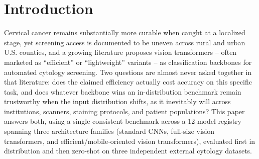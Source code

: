 \documentclass[runningheads]{llncs}
\begin{document}
\begin{abstract}
transformer-family models cluster at 0.293--0.523 (with one transformer
landing 0.003 above the lowest CNN -- a real, reported exception, not a
clean partition); on APCEM this apparent CNN-vs-transformer split
collapses entirely, since the CNN family alone spans both the best
(MobileNetV2) and one of the worst (ResNet-50) models in the registry.
One model (MobileViT-S) collapses to a Mendeley LBC AUROC of 0.215 --
actively anti-correlated with ground truth, not merely uninformative --
while its own architectural successor (MobileViTv2) shows no such failure
and is in fact the strongest model on that milder shift condition. No
single static property we measured -- parameter count, FLOPs,
in-distribution accuracy, or architecture family/lineage -- reliably
predicts which model fails safely under domain shift, and which model
fails safely is itself not stable across which external dataset is used
to test it.

\end{abstract}

\section{Introduction}

Cervical cancer remains substantially more curable when caught at a
localized stage, yet screening access is documented to be uneven across
rural and urban U.S. counties, and a growing literature proposes vision
transformers -- often marketed as ``efficient'' or ``lightweight''
variants -- as classification backbones for automated cytology screening.
Two questions are almost never asked together in that literature: does
the claimed efficiency actually cost accuracy on this specific task, and
does whatever backbone wins an in-distribution benchmark remain
trustworthy when the input distribution shifts, as it inevitably will
across institutions, scanners, staining protocols, and patient
populations? This paper answers both, using a single consistent benchmark
across a 12-model registry spanning three architecture families (standard
CNNs, full-size vision transformers, and efficient/mobile-oriented vision
transformers), evaluated first in distribution and then zero-shot on
three independent external cytology datasets.
\end{document}
